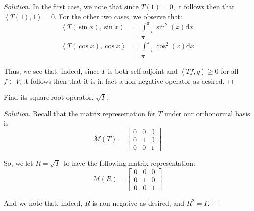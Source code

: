 \documentclass{article}
\newenvironment{solution}{\begin{proof}[Solution]}{\end{proof}}
\newcommand{\innerproduct}[2]{\left\langle{#1}, {#2}\right\rangle}
\begin{document}
\begin{solution}
	In the first case, we note that since $T(1) = 0$, it follows then that $\innerproduct{T(1)}{1} = 0$. For the other two cases, we observe that:
	\begin{align*}
		\innerproduct{T(\sin x)}{\sin x} &= \int_{-\pi}^{\pi} \sin^{2} (x) \mathrm dx \\
		&= \pi \\
		\innerproduct{T(\cos x)}{\cos x} &= \int_{-\pi}^{\pi} \cos^{2}(x) \mathrm dx \\
		&= \pi
	\end{align*}
	
	Thus, we see that, indeed, since $T$ is both self-adjoint and $\innerproduct{Tf}{g} \geq 0$ for all $f \in V$, it follows then that it is in fact a non-negative operator as desired.
\end{solution}

\begin{hw}
	Find its square root operator, $\sqrt{T}$.
\end{hw}
\begin{solution}
	Recall that the matrix representation for $T$ under our orthonormal basis is
	\begin{equation*}
		\mathcal{M}(T) = \begin{bmatrix}
			0 & 0 & 0 \\
			0 & 1 & 0 \\
			0 & 0 & 1
		\end{bmatrix}
	\end{equation*}

	So, we let $R = \sqrt{T}$ to have the following matrix representation:
	\begin{equation*}
		\mathcal{M}(R) = \begin{bmatrix}
			0 & 0 & 0 \\
			0 & 1 & 0 \\
			0 & 0 & 1
		\end{bmatrix}
	\end{equation*}

	And we note that, indeed, $R$ is non-negative as desired, and $R^{2} = T$.
\end{solution}
\end{document}
